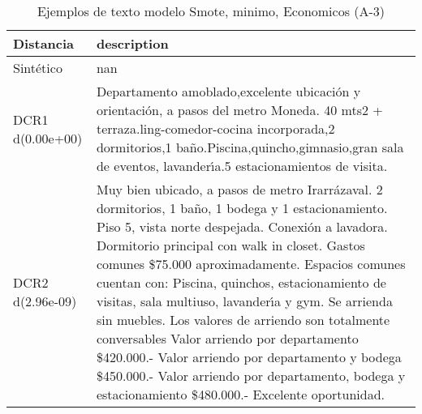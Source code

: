 \begin{table}[H]
\centering
\fontsize{10}{14}\selectfont
\caption{Ejemplos de texto modelo Smote, minimo, Economicos (A-3)}
\label{table-example-economicos-a-3-smote-enc-min-text}
\begin{tabular}{|l|m{35em}|}
\hline
\rowcolor[gray]{0.8}
Distancia & description \\
\hline Sintético & nan \\
\hline DCR1 d(0.00e+00) & Departamento amoblado,excelente ubicaci\'on y orientaci\'on, a pasos del metro Moneda. 40 mts2 + terraza.ling-comedor-cocina incorporada,2 dormitorios,1 ba\~no.Piscina,quincho,gimnasio,gran sala de eventos, lavander{\'\i}a.5 estacionamientos de visita. \\
\hline DCR2 d(2.96e-09) & Muy bien ubicado, a pasos de metro Irarr\'azaval.   2 dormitorios, 1 ba\~no, 1 bodega y 1 estacionamiento.  Piso 5, vista norte despejada.   Conexi\'on a lavadora.   Dormitorio principal con walk in closet.  Gastos comunes \$75.000 aproximadamente.   Espacios comunes cuentan con: Piscina, quinchos, estacionamiento de visitas, sala multiuso, lavander{\'\i}a y gym.  Se arrienda sin muebles.  Los valores de arriendo son totalmente conversables Valor arriendo por departamento \$420.000.- Valor arriendo por departamento y bodega \$450.000.- Valor arriendo por departamento, bodega y estacionamiento \$480.000.-  Excelente oportunidad. \\
\hline
\end{tabular}
\end{table}
